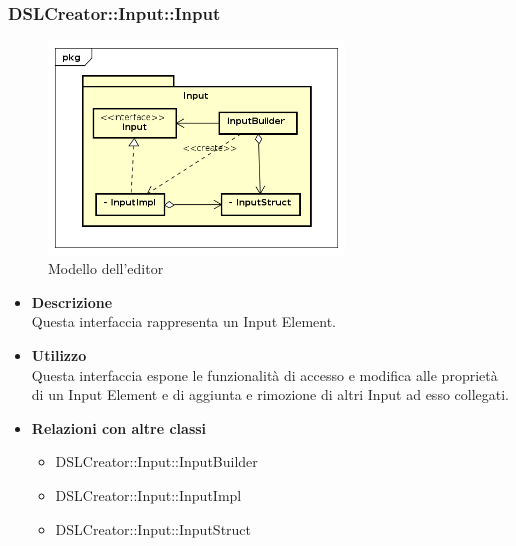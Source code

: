  \subsubsection{DSLCreator::Input::Input}
                 \begin{figure}[H]
                  \centering
                  \includegraphics[width=0.7\textwidth]{res/img/Input.png}
                  \caption{Modello dell'editor}
                  \label{fig:diagram_model}
                \end{figure}
                    \begin{itemize}
                        \item \textbf{Descrizione} \hfill \\
                          Questa interfaccia rappresenta un Input Element.
                        \item \textbf{Utilizzo} \hfill \\
                          Questa interfaccia espone le funzionalità di accesso e modifica alle proprietà di un Input Element e di aggiunta e rimozione di altri Input ad esso collegati.
                        \item \textbf{Relazioni con altre classi}
                            \begin{itemize}
                              \item DSLCreator::Input::InputBuilder
                              \item DSLCreator::Input::InputImpl
                              \item DSLCreator::Input::InputStruct
                            \end{itemize}
                    \end{itemize}  

